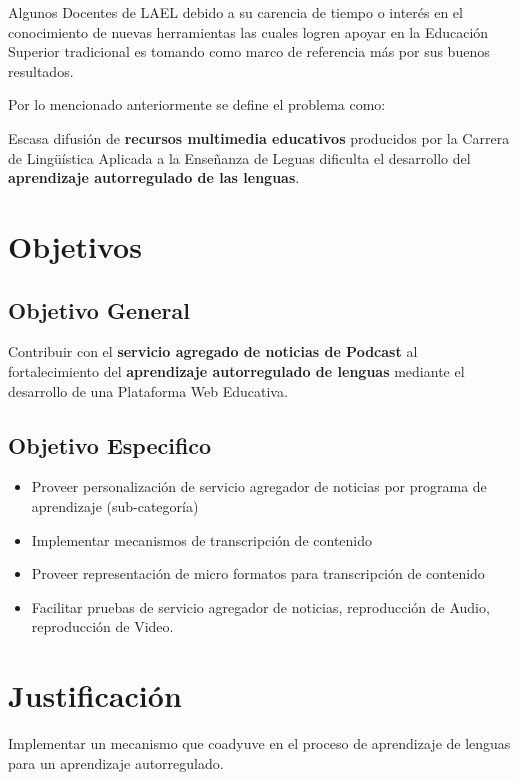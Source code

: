 Algunos Docentes de LAEL debido a su carencia de tiempo o interés en el
conocimiento de nuevas herramientas las cuales logren apoyar en la Educación
Superior tradicional es tomando como marco de referencia más por sus buenos
resultados.

Por lo mencionado anteriormente se define el problema como:

Escasa difusión de \textbf{recursos multimedia educativos} producidos por la Carrera de
Lingüística Aplicada a la Enseñanza de Leguas dificulta el desarrollo del \textbf{aprendizaje
autorregulado de las lenguas}.

\section{Objetivos}

\subsection{Objetivo General}

Contribuir con el \textbf{servicio agregado de noticias de Podcast} al fortalecimiento
del \textbf{aprendizaje autorregulado de lenguas} mediante el desarrollo de una
Plataforma Web Educativa.

\subsection{Objetivo Especifico}

\begin{itemize}

\item Proveer personalización de servicio agregador de noticias por programa de
aprendizaje (sub-categoría)

\item Implementar mecanismos de transcripción de contenido

\item Proveer representación de micro formatos para transcripción de contenido

\item Facilitar pruebas de servicio agregador de noticias, reproducción de Audio,
reproducción de Video.

\end{itemize}

\section{Justificación}
Implementar un mecanismo que coadyuve en el proceso de aprendizaje de lenguas
para un aprendizaje autorregulado.

